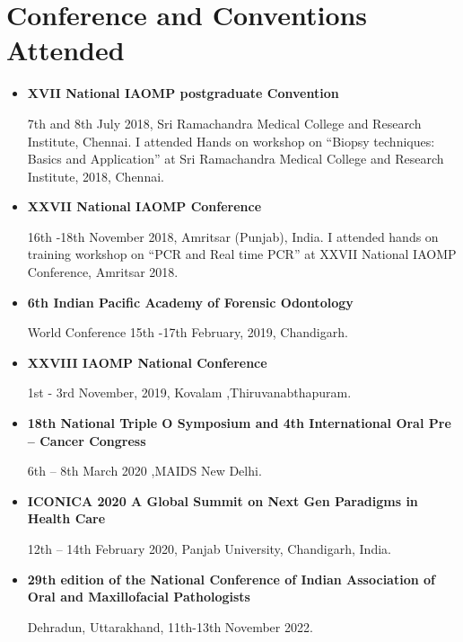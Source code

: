 \documentclass[11pt,a4paper,sans]{moderncv}        %
\begin{document}
\section{Conference and Conventions Attended}

\begin{itemize}

\item \textbf{XVII National IAOMP postgraduate Convention}

7th and 8th July 2018, Sri Ramachandra
Medical College and Research Institute, Chennai. I attended Hands on workshop on “Biopsy techniques: Basics and Application” at Sri
Ramachandra Medical College and Research Institute, 2018, Chennai.

\vspace{3pt}

\item \textbf{XXVII National IAOMP Conference}

16th -18th November 2018, Amritsar (Punjab),
India. I attended hands on training workshop on “PCR and Real time PCR” at XXVII National
IAOMP Conference, Amritsar 2018.

\vspace{3pt}
\item \textbf{6th Indian Pacific Academy of Forensic Odontology}

World Conference 15th -17th
February, 2019, Chandigarh.
\vspace{3pt}
\item \textbf{XXVIII IAOMP National Conference}

1st - 3rd November, 2019, Kovalam ,Thiruvanabthapuram.

\vspace{3pt}
\item \textbf{18th National Triple O Symposium and 4th International Oral Pre – Cancer Congress}

6th – 8th March 2020 ,MAIDS New Delhi.

\vspace{3pt}
\item \textbf{ICONICA 2020 A Global Summit on Next Gen Paradigms in Health Care}

12th – 14th February 2020, Panjab University, Chandigarh, India.

\vspace{3pt}
\item \textbf{29th edition of the National Conference of Indian Association of Oral and Maxillofacial
Pathologists}

Dehradun, Uttarakhand, 11th-13th November 2022.
    \vspace{3pt}
\end{itemize}
\end{document}
